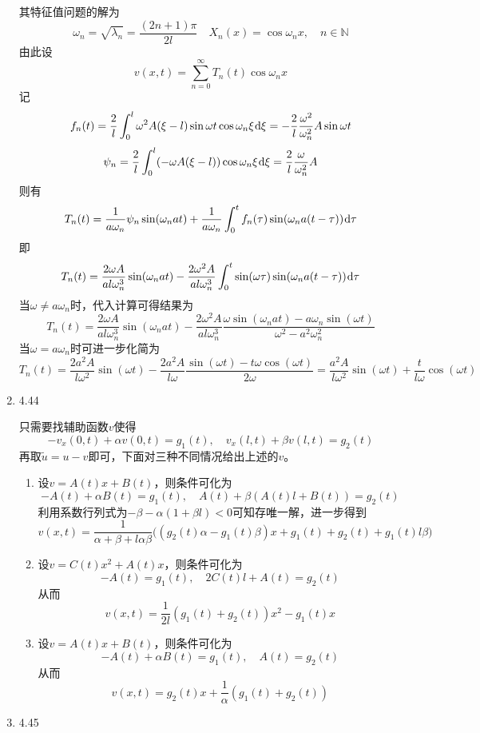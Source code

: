 \documentclass[a4paper,UTF8,fontset=windows,10pt]{ctexart}
\newcommand*{\dr}{\hspace{0.07em}\mathrm{d}}
\begin{document}
\begin{enumerate}
    其特征值问题的解为
    $$\omega_n=\sqrt{\lambda_n}=\frac{(2n+1)\pi}{2l}\quad X_n(x)=\cos\omega_nx,\quad n\in\mathbb{N}$$
    由此设
    $$v(x,t)=\sum_{n=0}^\infty T_n(t)\cos\omega_nx$$
    记
    $$f_n(t)=\frac{2}{l}\int_0^l\omega^2A(\xi-l)\sin\omega t\cos\omega_n\xi\dr\xi=-\frac{2}{l}\frac{\omega^2}{\omega_n^2}A\sin\omega t$$
    $$\psi_n=\frac{2}{l}\int_0^l(-\omega A(\xi-l))\cos\omega_n\xi\dr\xi=\frac{2}{l}\frac{\omega}{\omega_n^2}A$$
    则有
    $$T_n(t)=\frac{1}{a\omega_n}\psi_n\sin(\omega_nat)+\frac{1}{a\omega_n}\int_0^tf_n(\tau)\sin(\omega_na(t-\tau))\dr\tau$$
    即
    $$T_n(t)=\frac{2\omega A}{al\omega_n^3}\sin(\omega_nat)-\frac{2\omega^2A}{al\omega_n^3}\int_0^t\sin(\omega\tau)\sin(\omega_na(t-\tau))\dr\tau$$
    当$\omega\ne a\omega_n$时，代入计算可得结果为
    $$T_n(t)=\frac{2\omega A}{al\omega_n^3}\sin(\omega_nat)-\frac{2\omega^2A}{al\omega_n^3}\frac{\omega\sin(\omega_nat)-a\omega_n\sin(\omega t)}{\omega^2-a^2\omega_n^2}$$
    当$\omega=a\omega_n$时可进一步化简为
    $$T_n(t)=\frac{2a^2A}{l\omega^2}\sin(\omega t)-\frac{2a^2A}{l\omega}\frac{\sin(\omega t)-t\omega\cos(\omega t)}{2\omega}=\frac{a^2A}{l\omega^2}\sin(\omega t)+\frac{t}{l\omega}\cos(\omega t)$$
    
    \item 4.44
    
    只需要找辅助函数$v$使得
    $$-v_x(0,t)+\alpha v(0,t)=g_1(t),\quad v_x(l,t)+\beta v(l,t)=g_2(t)$$
    再取$\tilde{u}=u-v$即可，下面对三种不同情况给出上述的$v$。
    \begin{enumerate}[(1)]
        \item 设$v=A(t)x+B(t)$，则条件可化为
        $$-A(t)+\alpha B(t)=g_1(t),\quad A(t)+\beta(A(t)l+B(t))=g_2(t)$$
        利用系数行列式为$-\beta-\alpha(1+\beta l)<0$可知存唯一解，进一步得到
        $$v(x,t)=\frac{1}{\alpha+\beta+l\alpha\beta}\big((g_2(t)\alpha-g_1(t)\beta)x+g_1(t)+g_2(t)+g_1(t)l\beta\big)$$
    
        \item 设$v=C(t)x^2+A(t)x$，则条件可化为
        $$-A(t)=g_1(t),\quad 2C(t)l+A(t)=g_2(t)$$
        从而
        $$v(x,t)=\frac{1}{2l}(g_1(t)+g_2(t))x^2-g_1(t)x$$
    
    
        \item 设$v=A(t)x+B(t)$，则条件可化为
        $$-A(t)+\alpha B(t)=g_1(t),\quad A(t)=g_2(t)$$
        从而
        $$v(x,t)=g_2(t)x+\frac{1}{\alpha}(g_1(t)+g_2(t))$$
    \end{enumerate}
    
    \item 4.45
    

\end{enumerate}
\end{document}

